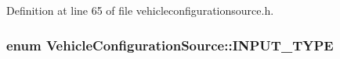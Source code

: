 Definition at line 65 of file vehicleconfigurationsource.\-h.

\hypertarget{group___vehicle_configuration_source_gae10edd59d3a32fad8c531a1d2346115c}{
\subsubsection[{I\-N\-P\-U\-T\-\_\-\-T\-Y\-P\-E}]{\setlength{\rightskip}{0pt plus 5cm}enum {\bf Vehicle\-Configuration\-Source\-::\-I\-N\-P\-U\-T\-\_\-\-T\-Y\-P\-E}}}\label{group___vehicle_configuration_source_gae10edd59d3a32fad8c531a1d2346115c}
